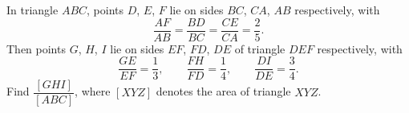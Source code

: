 In triangle $ABC$, points $D$, $E$, $F$ lie on sides $BC$, $CA$, $AB$ respectively, with
\[\dfrac{AF}{AB}=\dfrac{BD}{BC}=\dfrac{CE}{CA}=\dfrac25 .\]
Then points $G$, $H$, $I$ lie on sides $EF$, $FD$, $DE$ of triangle $DEF$ respectively, with
\[\dfrac{GE}{EF}=\dfrac13,\qquad\dfrac{FH}{FD}=\dfrac14,\qquad\dfrac{DI}{DE}=\dfrac34 .\]
Find $\dfrac{[GHI]}{[ABC]}$, where $[XYZ]$ denotes the area of triangle $XYZ$.
